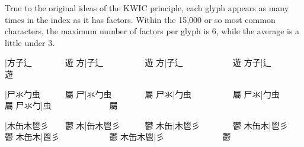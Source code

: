 \endgroup{}\begin{multicols}{2}True to the original ideas of the KWIC principle, each glyph appears
as many times in the index as it has factors. Within the 15,000 or so most
common characters, the maximum number of factors per glyph is 6, while the
average is a little under 3.\mktsShowpar\par
\begingroup\mktsObeyAllLines{}

\begingroup\mktsStyleCode{}{\cjk{}{\cnsym{}　　　　　　}}|{\cjk{}方子辶{\cnsym{}　　　　}遊} 
{\cjk{}{\cnsym{}　　　　　}方}|{\cjk{}子辶{\cnsym{}　　　　　}遊} 
{\cjk{}{\cnsym{}　　　　}方}|{\cjk{}子辶{\cnsym{}　　　　　　}遊} 
{\cjk{}{\cnsym{}　　　}方子}|{\cjk{}辶{\cnsym{}　　　　　　　}遊} 
\endgroup{}{}

\endgroup{}\begingroup\mktsObeyAllLines{}

\begingroup\mktsStyleCode{}{\cjk{}{\cnsym{}　　　　　　}}|{\cjk{}尸氺勹虫{\cnsym{}　　　}屬} 
{\cjk{}{\cnsym{}　　　　　}尸}|{\cjk{}氺勹虫{\cnsym{}　　　　}屬} 
{\cjk{}{\cnsym{}　　　　}尸氺}|{\cjk{}勹虫{\cnsym{}　　　　　}屬} 
{\cjk{}{\cnsym{}　　　}尸氺}|{\cjk{}勹虫{\cnsym{}　　　　　　}屬} 
{\cjk{}{\cnsym{}　　}尸氺勹}|{\cjk{}虫{\cnsym{}　　　　　　　}屬} 
\endgroup{}{}

\endgroup{}\begingroup\mktsObeyAllLines{}

\begingroup\mktsStyleCode{}{\cjk{}{\cnsym{}　　　　　　}}|{\cjk{}木缶木鬯彡{\cnsym{}　　}鬱} 
{\cjk{}{\cnsym{}　　　　　}木}|{\cjk{}缶木鬯彡{\cnsym{}　　　}鬱} 
{\cjk{}{\cnsym{}　　　　}木缶}|{\cjk{}木鬯彡{\cnsym{}　　　　}鬱} 
{\cjk{}{\cnsym{}　　　}木缶木}|{\cjk{}鬯彡{\cnsym{}　　　　　}鬱} 
{\cjk{}{\cnsym{}　　}木缶木}|{\cjk{}鬯彡{\cnsym{}　　　　　　}鬱} 
{\cjk{}{\cnsym{}　}木缶木鬯}|{\cjk{}彡{\cnsym{}　　　　　　　}鬱} 
\endgroup{}{}

\endgroup{}\end{multicols}\null\newpage{}\begin{multicols}{2}\end{multicols}
